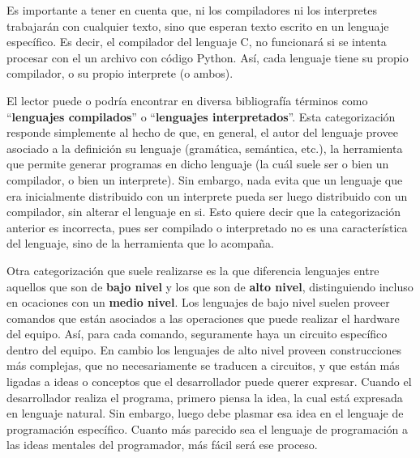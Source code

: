 Es importante a tener en cuenta que, ni los compiladores ni los interpretes
trabajarán con cualquier texto, sino que esperan texto escrito en un lenguaje
específico. Es decir, el compilador del lenguaje C, no funcionará si se intenta
procesar con el un archivo con código Python. Así, cada lenguaje tiene su propio
compilador, o su propio interprete (o ambos).

 El lector puede o podría
encontrar en diversa bibliografía términos como ``\textbf{lenguajes
compilados}'' o ``\textbf{lenguajes interpretados}''. Esta categorización
responde simplemente al hecho de que, en general, el autor del lenguaje provee
asociado a la definición su lenguaje (gramática, semántica, etc.), la
herramienta que permite generar programas en dicho lenguaje (la cuál suele ser o
bien un compilador, o bien un interprete). Sin embargo, nada evita que un
lenguaje que era inicialmente distribuido con un interprete pueda ser luego
distribuido con un compilador, sin alterar el lenguaje en si. Esto quiere decir
que la categorización anterior es incorrecta, pues ser compilado o interpretado
no es una característica del lenguaje, sino de la herramienta que lo acompaña.

 Otra categorización que suele realizarse es la que diferencia
lenguajes entre aquellos que son de \textbf{bajo nivel} y los que son de
\textbf{alto nivel}, distinguiendo incluso en ocaciones con un \textbf{medio
nivel}. Los lenguajes de bajo nivel suelen proveer comandos que están asociados
a las operaciones que puede realizar el hardware del equipo. Así, para cada
comando, seguramente haya un circuito específico dentro del equipo. En cambio
los lenguajes de alto nivel proveen construcciones más complejas, que no
necesariamente se traducen a circuitos, y que están más ligadas a ideas o
conceptos que el desarrollador puede querer expresar. Cuando el desarrollador
realiza el programa, primero piensa la idea, la cual está expresada en lenguaje
natural. Sin embargo, luego debe plasmar esa idea en el lenguaje de programación
específico. Cuanto más parecido sea el lenguaje de programación a las ideas
mentales del programador, más fácil será ese proceso.
\autocite{wexelblat_1981}

